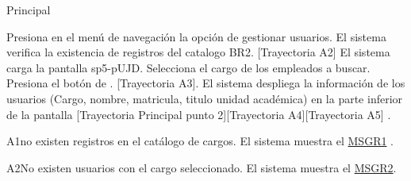 \begin{UCtrayectoria}{Principal}
    
    \UCpaso[\UCactor] Presiona en el menú de navegación la opción de gestionar usuarios. 
    \UCpaso  El sistema verifica la existencia de registros del catalogo  BR2. [Trayectoria A2] 
    \UCpaso El sistema carga la pantalla sp5-pUJD.
    \UCpaso[\UCactor] Selecciona el cargo de los empleados a buscar. 
    \UCpaso[\UCactor]  Presiona el botón de . [Trayectoria A3].
    \UCpaso El sistema despliega la información  de los usuarios (Cargo, nombre, matricula, titulo unidad académica) en la parte inferior de la pantalla [Trayectoria Principal punto 2][Trayectoria A4][Trayectoria A5] .
\end{UCtrayectoria}

\begin{UCtrayectoriaA}{A1}{no existen registros en el catálogo de cargos.}
	\UCpaso 	El sistema muestra el \hyperref[itm:MSGR1]{MSGR1} .
\end{UCtrayectoriaA}

\begin{UCtrayectoriaA}{A2}{No existen  usuarios con el cargo seleccionado.}
	\UCpaso 	El sistema muestra el \hyperref[MSGR2]{MSGR2}.
\end{UCtrayectoriaA}